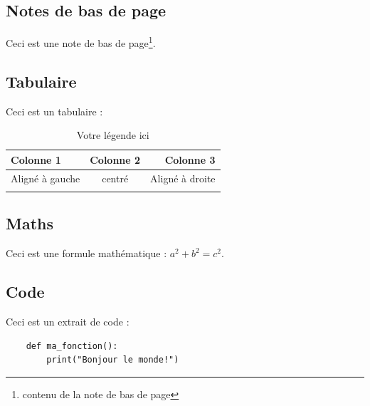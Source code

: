 \subsection{Notes de bas de page}\label{subsec:footnotes}

Ceci est une note de bas de page\footnote{contenu de la note de bas de page}.

\subsection{Tabulaire}\label{subsec:tabular}

Ceci est un tabulaire :

\begin{table}[h]
    \centering
    \begin{tabular}{|l|c|r|}
        \hline
        \rowcolor{white!75!black} \textbf{Colonne 1} & \textbf{Colonne 2} & \textbf{Colonne 3} \\
        \hline
        Aligné à gauche  & centré & Aligné à droite \\
        \hline
        & & \\
        \hline
    \end{tabular}
    \caption{Votre légende ici}
    \label{tab:your_label}
\end{table}

\subsection{Maths}\label{subsec:maths}

Ceci est une formule mathématique : $a^2 + b^2 = c^2$.

\subsection{Code}\label{subsec:code}

Ceci est un extrait de code :

\begin{verbatim}
    def ma_fonction():
        print("Bonjour le monde!")
\end{verbatim}